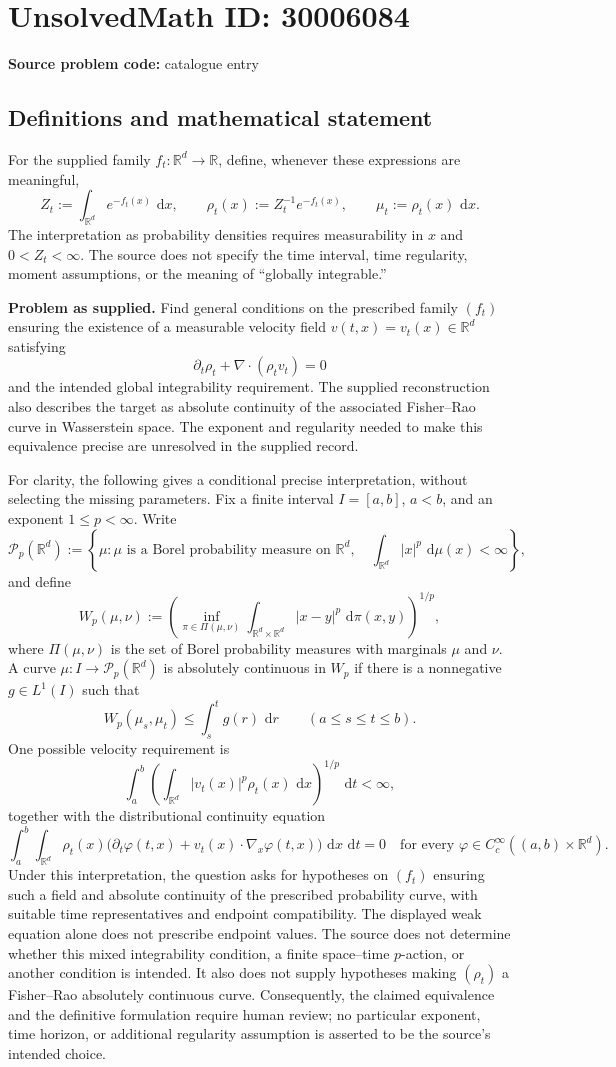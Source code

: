 \documentclass[11pt]{article}
\newcommand{\R}{\mathbb{R}}
\newcommand{\dd}{\,\mathrm{d}}
\begin{document}
\section*{UnsolvedMath ID: 30006084}
\textbf{Source problem code:} catalogue entry
\subsection{Definitions and mathematical statement}
For the supplied family \(f_t:\R^d\to\R\), define, whenever these expressions are meaningful,
\[
Z_t:=\int_{\R^d}e^{-f_t(x)}\,\dd x,\qquad
\rho_t(x):=Z_t^{-1}e^{-f_t(x)},\qquad
\mu_t:=\rho_t(x)\,\dd x.
\]
The interpretation as probability densities requires measurability in \(x\) and \(0<Z_t<\infty\). The source does not specify the time interval, time regularity, moment assumptions, or the meaning of ``globally integrable.''

\textbf{Problem as supplied.} Find general conditions on the prescribed family \((f_t)\) ensuring the existence of a measurable velocity field \(v(t,x)=v_t(x)\in\R^d\) satisfying
\[
\partial_t\rho_t+\nabla\!\cdot(\rho_t v_t)=0
\]
and the intended global integrability requirement. The supplied reconstruction also describes the target as absolute continuity of the associated Fisher--Rao curve in Wasserstein space. The exponent and regularity needed to make this equivalence precise are unresolved in the supplied record.

For clarity, the following gives a conditional precise interpretation, without selecting the missing parameters. Fix a finite interval \(I=[a,b]\), \(a<b\), and an exponent \(1\le p<\infty\). Write
\[
\mathcal P_p(\R^d):=\left\{\mu:\mu\text{ is a Borel probability measure on }\R^d,\quad \int_{\R^d}|x|^p\,\dd\mu(x)<\infty\right\},
\]
and define
\[
W_p(\mu,\nu):=\left(\inf_{\pi\in\Pi(\mu,\nu)}\int_{\R^d\times\R^d}|x-y|^p\,\dd\pi(x,y)\right)^{1/p},
\]
where \(\Pi(\mu,\nu)\) is the set of Borel probability measures with marginals \(\mu\) and \(\nu\). A curve \(\mu:I\to\mathcal P_p(\R^d)\) is absolutely continuous in \(W_p\) if there is a nonnegative \(g\in L^1(I)\) such that
\[
W_p(\mu_s,\mu_t)\le\int_s^t g(r)\,\dd r\qquad(a\le s\le t\le b).
\]
One possible velocity requirement is
\[
\int_a^b\left(\int_{\R^d}|v_t(x)|^p\rho_t(x)\,\dd x\right)^{1/p}\,\dd t<\infty,
\]
together with the distributional continuity equation
\[
\int_a^b\int_{\R^d}\rho_t(x)\bigl(\partial_t\varphi(t,x)+v_t(x)\cdot\nabla_x\varphi(t,x)\bigr)\,\dd x\,\dd t=0
\quad\text{for every }\varphi\in C_c^\infty((a,b)\times\R^d).
\]
Under this interpretation, the question asks for hypotheses on \((f_t)\) ensuring such a field and absolute continuity of the prescribed probability curve, with suitable time representatives and endpoint compatibility. The displayed weak equation alone does not prescribe endpoint values. The source does not determine whether this mixed integrability condition, a finite space--time \(p\)-action, or another condition is intended. It also does not supply hypotheses making \((\rho_t)\) a Fisher--Rao absolutely continuous curve. Consequently, the claimed equivalence and the definitive formulation require human review; no particular exponent, time horizon, or additional regularity assumption is asserted to be the source's intended choice.
\end{document}
